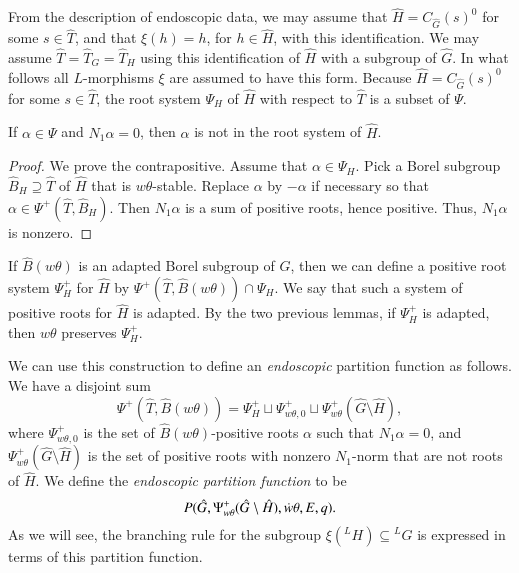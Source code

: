 From the description of endoscopic data, we may assume that
$\hat H = C_{\hat G}(s)^0$ for some $s\in \hat T$, and that
$\xi(h) = h$, for $h \in \hat H$, with this identification.  We may
assume $\hat T = \hat T_G = \hat T_H$ using this identification of
$\hat H$ with a subgroup of $\hat G$.  In what follows all
$L$-morphisms $\xi$ are assumed to have this form.  Because
$\hat H = C_{\hat G}(s)^0$ for some $s\in \hat T$, the root system
$\Psi_H$ of $\hat H$ with respect to $\hat T$ is a subset of $\Psi$.

\begin{lemma}   If $\alpha\in \Psi$ and  $N_1\alpha=0$, then
$\alpha$ is not in the root system of $\hat H$.
\end{lemma}

\begin{proof} We prove the contrapositive.  Assume that
  $\alpha\in\Psi_H$.  Pick a Borel subgroup $\hat B_H\supseteq \hat T$
  of $\hat H$ that is $w\theta$-stable.  Replace $\alpha$ by $-\alpha$
  if necessary so that $\alpha\in\Psi^+(\hat T,\hat B_H)$.  Then
  $N_1\alpha$ is a sum of positive roots, hence positive.  Thus,
  $N_1\alpha$ is nonzero.
\end{proof}

If $\hat B(w\theta)$ is an adapted Borel subgroup of $\hat G$, then we
can define a positive root system $\Psi_H^+$ for $\hat H$ by
$\Psi^+(\hat T,\hat B(w\theta))\cap \Psi_H$.  We say that such a
system of positive roots for $\hat H$ is adapted.  By the two previous
lemmas, if $\Psi^+_H$ is adapted, then $w\theta$ preserves $\Psi^+_H$.

We can use this construction to define an {\it endoscopic} partition
function as follows.  We have a disjoint sum
\begin{equation}\label{eqn:disj-b1}
\Psi^+(\hat T,\hat B(w\theta)) = 
\Psi^+_H \sqcup \Psi_{w\theta,0}^+ 
\sqcup \Psi_{w\theta}^+(\hat G\setminus\hat H),
\end{equation}
where $\Psi_{w\theta,0}^+$ is the set of $\hat B(w\theta)$-positive
roots $\alpha$ such that $N_1\alpha=0$, and $\Psi_{w\theta}^+(\hat
G\setminus\hat H)$ is the set of positive roots with nonzero
$N_1$-norm that are not roots of $\hat H$.  We define the {\it
  endoscopic partition function} to be
\begin{equation}\label{eqn:endo-partition}
P(\hat G,\Psi_{w\theta}^+(\hat G\setminus\hat H),\dot w\theta,E,q).
\end{equation}
As we will see, the branching rule for the subgroup
$\xi({}^LH)\subseteq {}^LG$ is expressed in terms of this partition
function.

